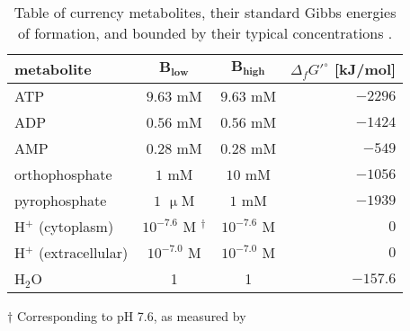 \documentclass[twocolumn]{article}
\begin{document}
\begin{table}[h!]
\caption{Table of currency metabolites, their standard Gibbs energies of formation, and bounded by their typical concentrations \cite{Bennett2009-rm}.}
\begin{tabular}{l|c|c|r}
\label{table:potentials}
\textbf{metabolite} & $\mathbf{B_{low}}$ & $\mathbf{B_{high}}$ & $\Delta_f G'^\circ$ [kJ/mol] \\ \hline
ATP & $9.63$ mM & $9.63$ mM & $-2296$ \\
ADP & $0.56$ mM & $0.56$ mM & $-1424$ \\
AMP & $0.28$ mM & $0.28$ mM & $-549$ \\
orthophosphate & $1$ mM & $10$ mM & $-1056$ \\
pyrophosphate & $1$ $\upmu$M & $1$ mM & $-1939$ \\
H$^+$ (cytoplasm) & $10^{-7.6}$ M $^\dagger$ & $10^{-7.6}$ M & $0$ \\
H$^+$ (extracellular) & $10^{-7.0}$ M & $10^{-7.0}$ M & $0$ \\
H$_2$O & 1 & 1 & $-157.6$
\end{tabular}
\begin{tablenotes}
\tiny
\item $\dagger$ Corresponding to pH 7.6, as measured by \citep{Wilks2007-lh}
\end{tablenotes}
\end{table}
\end{document}
